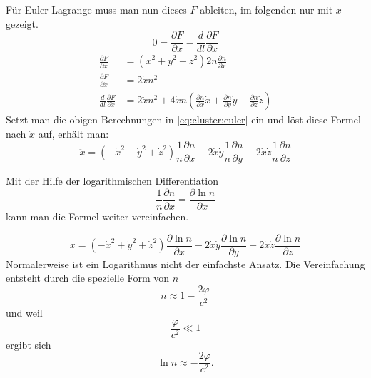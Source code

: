 \begin{refsection}
Für Euler-Lagrange muss man nun dieses \(F\) ableiten, im folgenden
nur mit \(x\) gezeigt.
\begin{equation}
  \label{eq:cluster:euler}
  0 = \frac{\partial F}{\partial x} - \frac{d}{d l} \frac{\partial
    F}{\partial \dot{x}}
\end{equation}
\begin{align*}
  \frac{\partial F}{\partial x} &= (\dot{x}^2+\dot{y}^2+\dot{z}^2) 2n
                                  \frac{\partial n}{\partial x}\\
  \frac{\partial F}{\partial\dot{x}} &= 2\dot{x}n^2\\
  \frac{d}{d l}\frac{\partial F}{\partial\dot{x}} &= 2\ddot{x}n^2 + 4\dot{x}n
                                \left(\frac{\partial n}{\partial x}\dot{x} +
                                \frac{\partial n}{\partial y}\dot{y} +
                                \frac{\partial n}{\partial z}\dot{z} \right)
\end{align*}
Setzt man die obigen Berechnungen in \ref{eq:cluster:euler} ein und
löst diese Formel nach \(\ddot{x}\) auf, erhält man:
\begin{equation}
  \ddot{x} = (-\dot{x}^2+\dot{y}^2+\dot{z}^2)
  \frac{1}{n}\frac{\partial n}{\partial x} -
  2\dot{x}\dot{y} \frac{1}{n}\frac{\partial n}{\partial y} -
  2\dot{x}\dot{z} \frac{1}{n}\frac{\partial n}{\partial z}
\end{equation}

Mit der Hilfe der logarithmischen Differentiation
\begin{equation*}
  \frac{1}{n} \frac{\partial n}{\partial x} = \frac{\partial \ln
    n}{\partial x}
\end{equation*}
kann man die Formel weiter vereinfachen.

\begin{equation}
  \ddot{x} = (-\dot{x}^2+\dot{y}^2+\dot{z}^2) \frac{\partial \ln
    n}{\partial x} - 2\dot{x}\dot{y} \frac{\partial \ln n}{\partial y}
  - 2\dot{x}\dot{z} \frac{\partial \ln n}{\partial z}
\end{equation}
Normalerweise ist ein Logarithmus nicht der einfachste Ansatz.  Die
Vereinfachung entsteht durch die spezielle Form von \(n\)
\begin{equation*}
  n \approx 1-\frac{2\varphi}{c^2}
\end{equation*}
und weil
\begin{equation*}
  \frac{\varphi}{c^2} \ll 1
\end{equation*}
ergibt sich
\begin{equation*}
  \ln n \approx -\frac{2\varphi}{c^2}.
\end{equation*}


\end{refsection}
